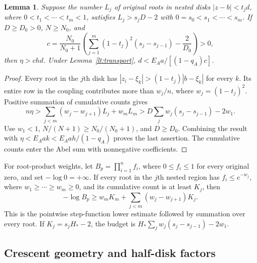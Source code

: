 \documentclass[11pt,reqno]{amsart}
\numberwithin{equation}{section}
\newtheorem{lemma}[theorem]{Lemma}
\theoremstyle{definition}
\theoremstyle{remark}
\begin{document}
\begin{lemma}\label{lt:abel}
Suppose the number $L_j$ of original roots in nested disks
$|z-b|<t_jd$, where $0<t_1<\cdots<t_m<1$, satisfies
$L_j>s_jD-2$ with $0=s_0<s_1<\cdots<s_m$.
If $D\ge D_0>0$, $N\ge N_0$, and
\[
 c=\frac{N_0}{N_0+1}
 \left(\sum_{j=1}^m(1-t_j)^2(s_j-s_{j-1})-\frac2{D_0}\right)>0,
\]
then $\eta>chd$. Under Lemma~\ref{lt:transport},
$d<E_Aa/[(1-q_A)c]$.
\end{lemma}
\begin{proof}
Every root in the $j$th disk has
$|z_i-\xi_k|>(1-t_j)|b-\xi_k|$ for every $k$.
Its entire row in the coupling contributes more than
$w_j/n$, where $w_j=(1-t_j)^2$. Positive summation of cumulative
counts gives
\[
 n\eta>\sum_{j<m}(w_j-w_{j+1})L_j+w_mL_m
 >D\sum_jw_j(s_j-s_{j-1})-2w_1.
\]
Use $w_1<1$, $N/(N+1)\ge N_0/(N_0+1)$, and $D\ge D_0$.
Combining the result with $\eta<E_Aak<E_Aah/(1-q_A)$ proves
the last assertion. The cumulative counts enter the Abel sum with
nonnegative coefficients.
\end{proof}

For root-product weights, let $B_p=\prod_{i=1}^n f_i$, where
$0\le f_i\le1$ for every original zero, and set $-\log0=+\infty$.
If every root in the $j$th nested region has $f_i\le e^{-w_j}$,
where $w_1\ge\cdots\ge w_m\ge0$, and its cumulative count is
at least $K_j$, then
\begin{equation}\label{lt:abel-product}
 -\log B_p\ge w_mK_m+\sum_{j<m}(w_j-w_{j+1})K_j.
\end{equation}
This is the pointwise step-function lower estimate followed by
summation over every root. If $K_j=s_jH_*-2$, the budget is
$H_*\sum_jw_j(s_j-s_{j-1})-2w_1$.

\subsection{Crescent geometry and half-disk factors}
\end{document}
